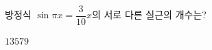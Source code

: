 방정식 $\sin\pi x=\dfrac{3}{10}x$의 서로 다른 실근의 개수는?
\begin{choices32}{$1$}{$3$}{$5$}{$7$}{$9$}\end{choices32}
